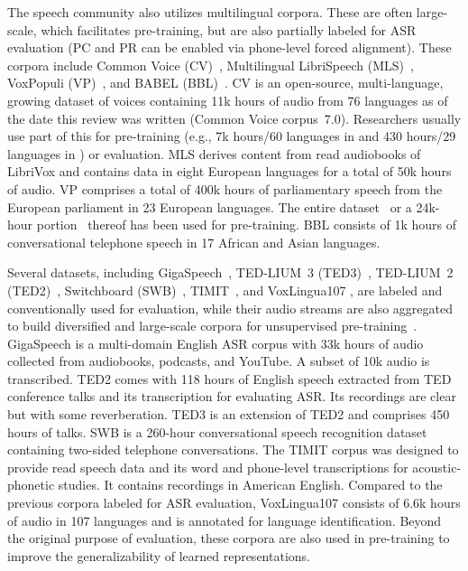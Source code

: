 The speech community also utilizes multilingual corpora. These are often
large-scale, which facilitates pre-training, but are also partially labeled for ASR
evaluation (PC and PR can be enabled via phone-level forced alignment). These
corpora include Common Voice (CV)~\parencite{ardila_common_2020}, Multilingual
LibriSpeech (MLS)~\parencite{pratap_mls_2020}, VoxPopuli 
(VP)~\parencite{wang_voxpopuli_2021}, and BABEL (BBL)~\parencite{gales_speech_2014}. CV is
an open-source, multi-language, growing dataset of voices containing 11k hours
of audio from 76 languages as of the date this review was written (Common Voice
corpus~7.0). Researchers usually use part of this for pre-training (e.g., 7k
hours/60 languages in \parencite{babu_xlsr_2021} and 430 hours/29 languages in
\parencite{kawakami_learning_2020}) or evaluation. 
MLS derives content from read audiobooks of LibriVox and contains data in eight
European languages for a total of 50k hours of audio. VP comprises a total of 400k
hours of parliamentary speech from the European parliament in 23 European
languages.
The entire dataset~\parencite{babu_xlsr_2021} or a 24k-hour 
portion~\parencite{chen_unispeechsat_2021, chen_wavlm_2021} thereof has been used for pre-training. BBL
consists of 1k hours of conversational telephone speech in 17 African and Asian
languages.

Several datasets, including GigaSpeech~\parencite{chen_gigaspeech_2021}, TED-LIUM~3
(TED3)~\parencite{hernandez_tedlium_2018}, TED-LIUM~2 (TED2)~\parencite{rousseau_tedlium_2012},
Switchboard (SWB)~\parencite{godfrey_switchboard_1992}, 
TIMIT~\parencite{garofolo_timit_1993}, and VoxLingua107 \parencite{valk_voxlingua107_2021}, are
labeled and conventionally used for evaluation, while their audio streams are
also aggregated to build diversified and large-scale corpora for unsupervised
pre-training~\parencite{kawakami_learning_2020, song_speechxlnet_2020, babu_xlsr_2021}.
GigaSpeech is a multi-domain English ASR corpus with 33k hours of audio
collected from audiobooks, podcasts, and YouTube. A subset of 10k audio is
transcribed. TED2 comes with 118 hours of English speech extracted from
TED conference talks and its transcription for evaluating ASR. Its recordings
are clear but with some reverberation. TED3 is an extension of TED2 and
comprises 450 hours of talks. SWB is a 260-hour conversational speech
recognition dataset containing two-sided telephone conversations.
The TIMIT corpus was designed to provide read speech data and its word and
phone-level transcriptions for acoustic-phonetic studies. It contains recordings
in American English. Compared to the previous corpora labeled for ASR
evaluation, VoxLingua107 consists of 6.6k hours of audio in 107 languages and
is annotated for language identification. Beyond the original purpose of
evaluation, these corpora are also used in pre-training to improve the
generalizability of learned representations.

